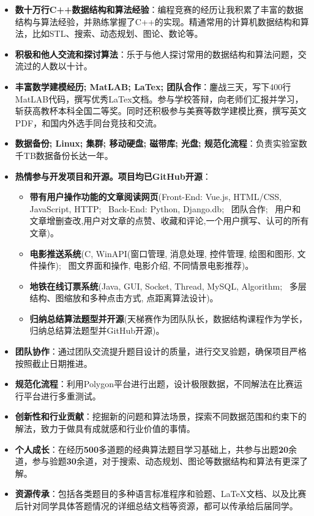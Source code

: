 \documentclass{resume}
\begin{document}
\begin{itemize}
	\item \textbf{数十万行C++数据结构和算法经验}：编程竞赛的经历让我积累了丰富的数据结构与算法经验，并熟练掌握了C++的实现。精通常用的计算机数据结构和算法，比如STL、搜索、动态规划、图论、数论等。
	\item \textbf{积极和他人交流和探讨算法}：乐于与他人探讨常用的数据结构和算法问题，交流过的人数以十计。
	\item \textbf{丰富数学建模经历; MatLAB; LaTex; 团队合作}：鏖战三天，写下400行MatLAB代码，撰写优秀LaTex文档。参与学校答辩，向老师们汇报并学习，斩获高教杯本科全国二等奖。同时还积极参与美赛等数学建模比赛，撰写英文PDF，和国内外选手同台竞技和交流。
	\item \textbf{数据备份; Linux; 集群; 移动硬盘; 磁带库; 光盘; 规范化流程}：负责实验室数千TB数据备份长达一年。
	\item \textbf{热情参与开发项目和开源。项目均已GitHub开源}：
		\begin{itemize}
			\item \textbf{带有用户操作功能的文章阅读网页}(Front-End: Vue.js, HTML/CSS, JavaScript, HTTP; \, Back-End: Python, Django.db; \, 团队合作; \, 用户和文章增删查改,用户对文章的点赞、收藏和评论,一个用户撰写、认可的所有文章)。
			\item \textbf{电影推送系统}(C, WinAPI(窗口管理, 消息处理, 控件管理, 绘图和图形, 文件操作); \, 图文界面和操作, 电影介绍, 不同情景电影推荐)。
			\item \textbf{地铁在线订票系统}(Java, GUI, Socket, Thread, MySQL, Algorithm; \, 多层结构、图缩放和多种点击方式, 点距离算法设计)。
			\item \textbf{归纳总结算法题型并开源}(天梯赛作为团队队长，数据结构课程作为学长，归纳总结算法题型并GitHub开源)。
		\end{itemize}
\end{itemize}

\begin{itemize}
	\item \textbf{团队协作}：通过团队交流提升题目设计的质量，进行交叉验题，确保项目严格按照截止日期推进。
	\item \textbf{规范化流程}：利用Polygon平台进行出题，设计极限数据，不同解法在比赛运行平台进行多重测试。
	\item \textbf{创新性和行业贡献}：挖掘新的问题和算法场景，探索不同数据范围和约束下的解法，致力于做具有成就感和行业价值的事情。
	\item \textbf{个人成长}：在经历\textbf{500}多道题的经典算法题目学习基础上，共参与出题\textbf{20}余道，参与验题\textbf{30}余道，对于搜索、动态规划、图论等数据结构和算法有更深了解。
	\item \textbf{资源传承}：包括各类题目的多种语言标准程序和验题、LaTeX文档、以及比赛后针对同学具体答题情况的详细总结文档等资源，都可以传承给后届同学。
\end{itemize}
\end{document}
